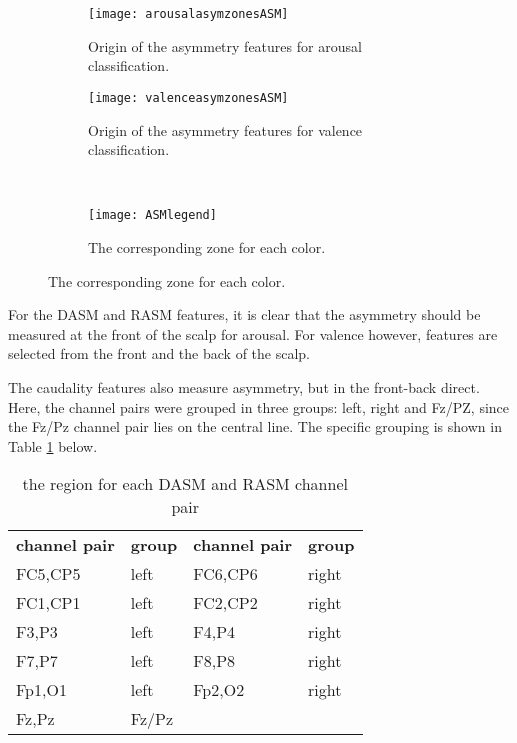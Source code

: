 \begin{figure}[H]
\centering
  \begin{subfigure}[b]{.4\textwidth}
    \texttt{[image: arousalasymzonesASM]}
    \caption{Origin of the asymmetry features for arousal classification.\label{arousalasymzonesASM}}
  \end{subfigure}
\hfill
  \begin{subfigure}[b]{.4\textwidth}
    \texttt{[image: valenceasymzonesASM]}
    \caption{Origin of the asymmetry features for valence classification.\label{valenceasymzonesASM}}
  \end{subfigure}
\\
  \begin{subfigure}[b]{.4\textwidth}
    \texttt{[image: ASMlegend]}
    \caption{The corresponding zone for each color.\label{ASMlegend}}
  \end{subfigure}
\end{figure}

For the DASM and RASM features, it is clear that the asymmetry should be measured at the front of the scalp for arousal. For valence however, features are selected from the front and the back of the scalp.

\npar

The caudality features also measure asymmetry, but in the front-back direct. Here, the channel pairs were grouped in three groups: left, right and Fz/PZ, since the Fz/Pz channel pair lies on the central line. The specific grouping is shown in Table \ref{CAUgroupTable} below.

\begin{table}[H]
\centering
\begin{tabular}{ll|ll}
\textbf{channel pair} & \textbf{group} & \textbf{channel pair} & \textbf{group} \\
FC5,CP5               & left           & FC6,CP6               & right          \\
FC1,CP1               & left           & FC2,CP2               & right          \\
F3,P3                 & left           & F4,P4                 & right          \\
F7,P7                 & left           & F8,P8                 & right          \\
Fp1,O1                & left           & Fp2,O2                & right          \\
Fz,Pz                 & Fz/Pz          &                       &                \\
\end{tabular}
\caption{the region for each DASM and RASM channel pair\label{CAUgroupTable}}
\end{table}

